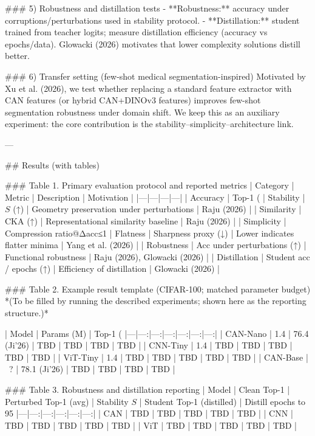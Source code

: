 ### 5) Robustness and distillation tests  
- **Robustness:** accuracy under corruptions/perturbations used in stability protocol.  
- **Distillation:** student trained from teacher logits; measure distillation efficiency (accuracy vs epochs/data). Glowacki (2026) motivates that lower complexity solutions distill better.

### 6) Transfer setting (few-shot medical segmentation-inspired)  
Motivated by Xu et al. (2026), we test whether replacing a standard feature extractor with CAN features (or hybrid CAN+DINOv3 features) improves few-shot segmentation robustness under domain shift. We keep this as an auxiliary experiment: the core contribution is the stability–simplicity–architecture link.

---

## Results (with tables)  

### Table 1. Primary evaluation protocol and reported metrics  
| Category | Metric | Description | Motivation |
|---|---|---|---|
| Accuracy | Top-1 (%
| Stability | \(S\) (↑) | Geometry preservation under perturbations | Raju (2026) |
| Similarity | CKA (↑) | Representational similarity baseline | Raju (2026) |
| Simplicity | Compression ratio@Δacc≤1%
| Flatness | Sharpness proxy (↓) | Lower indicates flatter minima | Yang et al. (2026) |
| Robustness | Acc under perturbations (↑) | Functional robustness | Raju (2026), Glowacki (2026) |
| Distillation | Student acc / epochs (↑) | Efficiency of distillation | Glowacki (2026) |

### Table 2. Example result template (CIFAR-100; matched parameter budget)  
*(To be filled by running the described experiments; shown here as the reporting structure.)*  

| Model | Params (M) | Top-1 (%
|---|---:|---:|---:|---:|---:|---:|
| CAN-Nano | 1.4 | 76.4 (Ji’26) | TBD | TBD | TBD | TBD |
| CNN-Tiny | 1.4 | TBD | TBD | TBD | TBD | TBD |
| ViT-Tiny | 1.4 | TBD | TBD | TBD | TBD | TBD |
| CAN-Base | ~? | 78.1 (Ji’26) | TBD | TBD | TBD | TBD |

### Table 3. Robustness and distillation reporting  
| Model | Clean Top-1 | Perturbed Top-1 (avg) | Stability \(S\) | Student Top-1 (distilled) | Distill epochs to 95%
|---|---:|---:|---:|---:|---:|
| CAN | TBD | TBD | TBD | TBD | TBD |
| CNN | TBD | TBD | TBD | TBD | TBD |
| ViT | TBD | TBD | TBD | TBD | TBD |

